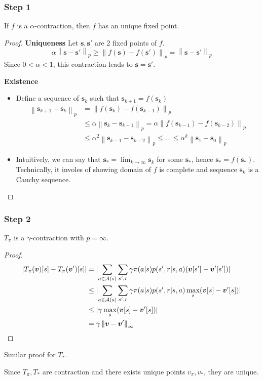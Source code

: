 \documentclass[10pt]{beamer}
\DeclarePairedDelimiter\abs{\lvert}{\rvert}%
\newcommand\norm[1]{\left\lVert#1\right\rVert}
\theoremstyle{remark}
\begin{document}
\begin{frame}
    \frametitle{Step 1}
    If $f$ is a $\alpha$-contraction, then  $f$ has an unique fixed  point.

     \begin{proof}
        \textbf{Uniqueness}
        Let $\bm{s}, \bm{s}'$ are 2 fixed points of $f$.
         \[
             \alpha \norm{\bm{s} - \bm{s}'}_p \geq \norm{f(\bm{s}) - f(\bm{s}')}_p = \norm{\bm{s} - \bm{s}'}_p
        \] 
        Since $0 < \alpha <1 $, this contraction leads to $\bm{s} = \bm{s}'$.

        \textbf{Existence}
        \begin{itemize}
            \item Define a sequence of $\bm{s}_k$ such that $\bm{s}_{k+1} = f(\bm{s}_k)$
                \begin{align*}
                    \norm{\bm{s}_{k+1} - \bm{s}_k}_p
                    &= \norm{f(\bm{s}_k) - f(\bm{s}_{k-1})}_p  \\
                    &\leq \alpha \norm{\bm{s}_k - \bm{s}_{k-1}}_p
                    = \alpha \norm{f(\bm{s}_{k-1}) - f(\bm{s}_{k-2})}_p  \\
                    &\leq \alpha^2 \norm{\bm{s}_{k-1} - \bm{s}_{k-2}}_p \leq \ldots \leq \alpha^{k} \norm{\bm{s}_1 - \bm{s}_0}_p
                \end{align*} 
            \item Intuitively, we can say that $\bm{s}_{\ast} = \lim_{k \rightarrow \infty} \bm{s}_{k}$ for some $\bm{s}_{\ast}$, hence $\bm{s}_{\ast} = f(\bm{s}_{\ast})$. Technically, it involes of showing domain of $f$ is complete and sequence ${\bm{s}_k}$ is a Cauchy sequence.
        \end{itemize}
    \end{proof}
\end{frame}

\begin{frame}
    \frametitle{Step 2}
    $T_{\pi}$ is a $\gamma$-contraction with $p = \infty$.

     \begin{proof}
         \begin{align*}
             \abs{T_{\pi}(\bm{v})[s] - T_{\pi}(\bm{v}')[s]} 
             &= \abs{ \sum_{a \in \mathcal{A}(s)} \sum_{s', r} \gamma \pi(a|s) p(s', r| s, a) (\bm{v}[ s' ] - \bm{v}'[ s' ]) }    \\
             & \leq  \abs{ \sum_{a \in \mathcal{A}(s)} \sum_{s', r} \gamma \pi(a|s) p(s', r| s, a) \max_{s} (\bm{v}[ s ] - \bm{v}'[ s ]) }    \\
             & \leq  \abs{   \gamma \max_{s } (\bm{v}[ s ] - \bm{v}'[ s ]) }    \\
             & =    \gamma \norm{ \bm{v} - \bm{v}' }_{\infty}    \\
         \end{align*} 
    \end{proof}
    Similar proof for $T_{\ast}$. 

    Since $T_{\pi}, T_{\ast}$ are  contraction and there exists unique points $v_{\pi}, v_{\ast}$, they are unique.
\end{frame}
\end{document}
